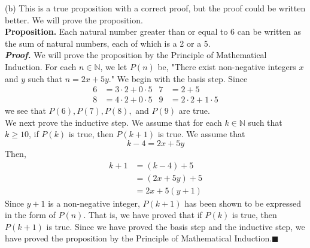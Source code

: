 \documentclass{article}
\begin{document}
(b) This is a true proposition with a correct proof, but the proof could be written better. We will prove the proposition.\\
\textbf{Proposition.} Each natural number greater than or equal to 6 can be written as the sum of natural numbers, each of which is a 2 or a 5.\\
\textit{\textbf{Proof.}} We will prove the proposition by the Principle of Mathematical Induction. For each $n \in \mathbb{N}$, we let $P(n)$ be, "There exist non-negative integers $x$ and $y$ such that $n = 2x + 5y.$" We begin with the basis step. Since
\begin{align*}
6 &= 3 \cdot 2 + 0 \cdot 5 & 7 &= 2 + 5\\
8 &= 4 \cdot 2 + 0 \cdot 5 & 9 &= 2 \cdot 2 + 1 \cdot 5
\end{align*}
we see that $P(6), P(7), P(8),$ and $P(9)$ are true.\\
We next prove the inductive step. We assume that for each $k \in \mathbb{N}$ such that $k \geq 10$, if $P(k)$ is true, then $P(k + 1)$ is true. We assume that
\begin{equation*}
k - 4 = 2x + 5y
\end{equation*}
Then,
\begin{align*}
k + 1 &= (k - 4) + 5\\
&= (2x + 5y) + 5\\
&= 2x + 5(y + 1)
\end{align*}
Since $y + 1$ is a non-negative integer, $P(k + 1)$ has been shown to be expressed in the form of $P(n)$. That is, we have proved that if $P(k)$ is true, then $P(k + 1)$ is true. Since we have proved the basis step and the inductive step, we have proved the proposition by the Principle of Mathematical Induction.\hfill$\blacksquare$
\end{document}
